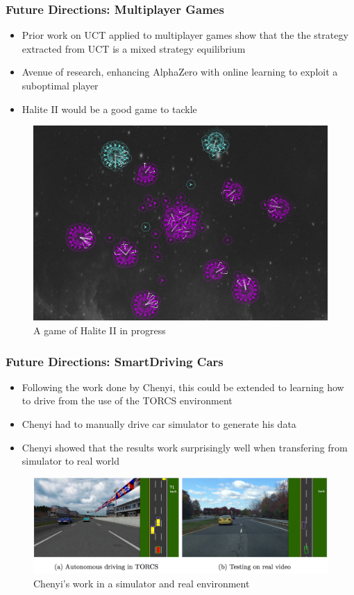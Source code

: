 \documentclass{beamer}
\begin{document}
\begin{frame}
  \frametitle{Future Directions: Multiplayer Games}

  \begin{itemize}
    \item Prior work on UCT applied to multiplayer games show that the the strategy extracted from UCT is a mixed strategy equilibrium
    \item Avenue of research, enhancing AlphaZero with online learning to exploit a suboptimal player
    \item Halite II would be a good game to tackle
  \end{itemize}

  \begin{figure}
    \includegraphics[width=0.45\linewidth]{./images/halite.png}
    \caption{A game of Halite II in progress}
  \end{figure}
\end{frame}



\begin{frame}
  \frametitle{Future Directions: SmartDriving Cars}

  \begin{itemize}
    \item Following the work done by Chenyi, this could be extended to learning how to drive from the use of the TORCS environment
    \item Chenyi had to manually drive car simulator to generate his data
    \item Chenyi showed that the results work surprisingly well when transfering from simulator to real world
  \end{itemize}
  \begin{figure}
    \includegraphics[width=0.8\linewidth]{./images/torcs.png}
    \caption{Chenyi's work in a simulator and real environment}
  \end{figure}
\end{frame}
\end{document}
